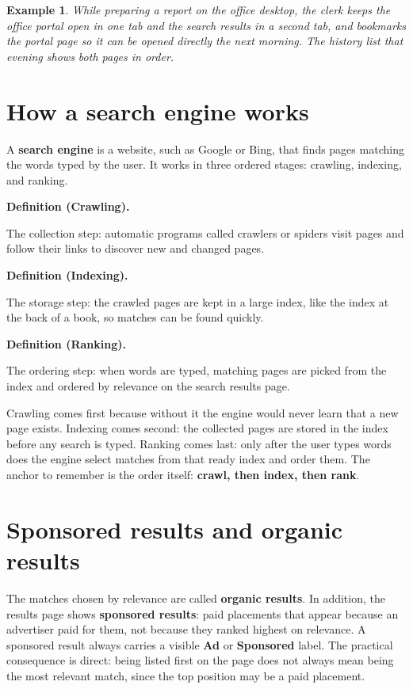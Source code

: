 \documentclass[11pt]{article}
\newtheorem{example}{Example}[section]
\newenvironment{definitionbox}[1]{%
  \par\noindent\textbf{Definition (#1).}\ \itshape
}{\par\vspace{0.3em}}
\begin{document}
\begin{example}
While preparing a report on the office desktop, the clerk keeps the office
portal open in one tab and the search results in a second tab, and bookmarks
the portal page so it can be opened directly the next morning. The history
list that evening shows both pages in order.
\end{example}

\section{How a search engine works}
A \textbf{search engine} is a website, such as Google or Bing, that finds
pages matching the words typed by the user. It works in three ordered stages:
crawling, indexing, and ranking.

\begin{definitionbox}{Crawling}
The collection step: automatic programs called crawlers or spiders visit
pages and follow their links to discover new and changed pages.
\end{definitionbox}

\begin{definitionbox}{Indexing}
The storage step: the crawled pages are kept in a large index, like the
index at the back of a book, so matches can be found quickly.
\end{definitionbox}

\begin{definitionbox}{Ranking}
The ordering step: when words are typed, matching pages are picked from the
index and ordered by relevance on the search results page.
\end{definitionbox}

Crawling comes first because without it the engine would never learn that a
new page exists. Indexing comes second: the collected pages are stored in the
index before any search is typed. Ranking comes last: only after the user
types words does the engine select matches from that ready index and order
them. The anchor to remember is the order itself: \textbf{crawl, then index,
then rank}.

\section{Sponsored results and organic results}
The matches chosen by relevance are called \textbf{organic results}. In
addition, the results page shows \textbf{sponsored results}: paid placements
that appear because an advertiser paid for them, not because they ranked
highest on relevance. A sponsored result always carries a visible
\textbf{Ad} or \textbf{Sponsored} label. The practical consequence is direct:
being listed first on the page does not always mean being the most relevant
match, since the top position may be a paid placement.
\end{document}

